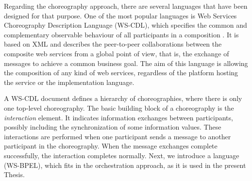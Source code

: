 Regarding the choreography approach, there are several languages that 
have been designed for that purpose. One of the most popular languages 
is Web Services Choreography Description Language (WS-CDL), 
which specifies the common and complementary observable behaviour of 
all participants in a composition \cite{WSCDL}. 
It is based on XML and describes the peer-to-peer collaborations 
between the composite web services from a global point of view, that is, 
the exchange of messages to achieve a common business goal. 
The aim of this language is allowing the composition of any kind of web services, 
regardless of the platform hosting the service or the implementation language. 


A WS-CDL document defines a hierarchy of choreographies, where there is only one top-level choreography. 
The basic building block of a choreography is the \textit{interaction} element. It indicates information exchanges between participants, possibly including the synchronization of some information values. These interactions are performed when one participant sends a message to another participant in the choreography. When the message exchanges complete successfully, the interaction completes normally. Next, we introduce a language (WS-BPEL), which fits 
in the orchestration approach, as it is used in the present Thesis.

